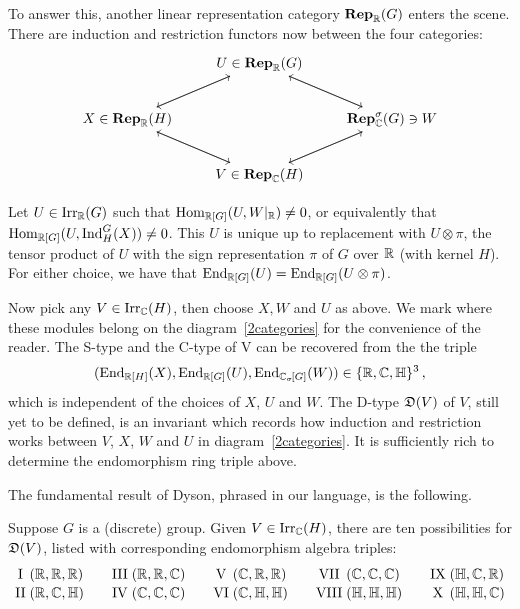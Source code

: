 To answer this, another linear representation category $\operatorname{\mathbf{Rep}}_{{\mathbb R}}(G)$ enters the scene.
There are induction and restriction functors now between the four categories: 
\begin{equation} \label{2categories}
  \begin{tikzcd}[sep=2.25em]
	& {U \in \Rep_{\bR}(G)} & \\
	{X\in \Rep_{\bR}(H)} && {\Rep_{\bC}^{\sigma}(G) \ni W} \\
	& {V\in \Rep_{\bC}(H)}
	\arrow[from=1-2, to=2-1]
	\arrow[from=1-2, to=2-3]
	\arrow[from=2-1, to=1-2]
	\arrow[from=2-1, to=3-2]
	\arrow[from=2-3, to=1-2]
	\arrow[from=2-3, to=3-2]
	\arrow[from=3-2, to=2-1]
	\arrow[from=3-2, to=2-3]
\end{tikzcd}\end{equation}

Let $U \in \operatorname{Irr}_{{\mathbb R}}(G)$ such that $\operatorname{Hom}_{{\mathbb R}[G]}(U, W|_{{\mathbb R}}) \neq 0$, or equivalently that $\operatorname{Hom}_{{\mathbb R}[G]}(U, \operatorname{Ind}_{H}^G(X)) \neq 0$. This $U$ is unique up to replacement with $U \otimes \pi$, the tensor product of $U$ with the sign representation $\pi$ of $G$ over ${\mathbb R}$ (with kernel $H$). For either choice, we have that $\operatorname{End}_{{\mathbb R}[G]}(U) = \operatorname{End}_{{\mathbb R}[G]}(U \otimes \pi)$. 

Now pick any $V \in \operatorname{Irr}_{{\mathbb C}}(H)$, then choose $X, W$ and $U$ as above. We mark where these modules belong on the diagram~\eqref{2categories} for the convenience of the reader. The S-type and the C-type of V can be recovered from the the triple 
\[
(\operatorname{End}_{{\mathbb R}[H]}(X), \operatorname{End}_{{\mathbb R}[G]}(U), \operatorname{End}_{{\mathbb C}_{\sigma}\hspace{-0.1em}[G]}(W)) \in \{{\mathbb R}, {\mathbb C}, {\mathbb H}\}^3 \, ,
\]
which is independent of the choices of $X$, $U$ and $W$. The D-type ${\mathfrak D}(V)$ of $V$, still yet to be defined, is an invariant which records how induction and restriction works between $V$, $X$, $W$ and $U$ in diagram~\eqref{2categories}. It is sufficiently rich to determine the endomorphism ring triple above.

The fundamental result of Dyson, phrased in our language, is the following.
\begin{theorem*}
Suppose $G$ is a (discrete) group.
Given $V \in \operatorname{Irr}_{{\mathbb C}}(H)$, there are ten possibilities for ${\mathfrak D}(V)$, listed with corresponding endomorphism algebra triples:
\[
\renewcommand{\arraystretch}{1.1}
\begin{array}{@{}c@{\;}l@{\qquad}
                c@{\;}l@{\qquad}
                c@{\;}l@{\qquad}
                c@{\;}l@{\qquad}
                c@{\;}l@{}}
\mathrm{I}    & (\bR,\bR,\bR) &
\mathrm{III}  & (\bR,\bR,\bC) &
\mathrm{V}    & (\bC,\bR,\bR) &
\mathrm{VII}  & (\bC,\bC,\bC) &
\mathrm{IX}   & (\bH,\bC,\bR) \\

\mathrm{II}   & (\bR,\bC,\bH) &
\mathrm{IV}   & (\bC,\bC,\bC) &
\mathrm{VI}   & (\bC,\bH,\bH) &
\mathrm{VIII} & (\bH,\bH,\bH) &
\mathrm{X}    & (\bH,\bH,\bC)
\end{array}
\]
\end{theorem*}

